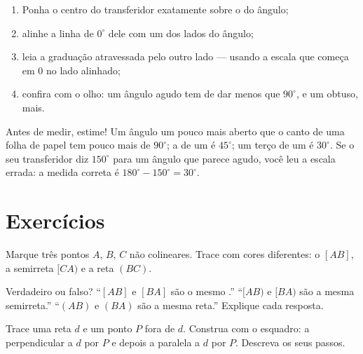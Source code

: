 \begin{method}\label{met:g6:lines:protractor}
\begin{enumerate}
  \item Ponha o centro do transferidor exatamente sobre o  do
        ângulo;
  \item alinhe a linha de $0^\circ$ dele com um dos lados do ângulo;
  \item leia a graduação atravessada pelo outro lado --- usando a
        escala que começa em $0$ no lado alinhado;
  \item confira com o olho: um ângulo agudo tem de dar menos que
        $90^\circ$, e um obtuso, mais.
\end{enumerate}
\end{method}

\begin{example}\label{ex:g6:lines:estimate}
Antes de medir, estime! Um ângulo um pouco mais aberto que o canto de
uma folha de papel tem pouco mais de $90^\circ$; a  de um  é $45^\circ$; um terço de um  é $30^\circ$. Se o seu
transferidor diz $150^\circ$ para um ângulo que parece agudo, você leu a
escala errada: a medida correta é $180^\circ - 150^\circ = 30^\circ$.
\end{example}

\section{Exercícios}

\begin{exercise}[$\star$]\label{exo:g6:lines:1}
Marque três pontos $A$, $B$, $C$ não colineares. Trace com cores
diferentes: o  $[AB]$, a semirreta $[CA)$ e a reta $(BC)$.
\end{exercise}

\begin{exercise}[$\star$]\label{exo:g6:lines:2}
Verdadeiro ou falso? ``$[AB]$ e $[BA]$ são o mesmo .''
``$[AB)$ e $[BA)$ são a mesma semirreta.'' ``$(AB)$ e $(BA)$ são a
mesma reta.'' Explique cada resposta.
\end{exercise}

\begin{exercise}[$\star$]\label{exo:g6:lines:3}
Trace uma reta $d$ e um ponto $P$ fora de $d$. Construa com o esquadro:
a perpendicular a $d$ por $P$ e depois a paralela a $d$ por $P$.
Descreva os seus passos.
\end{exercise}

